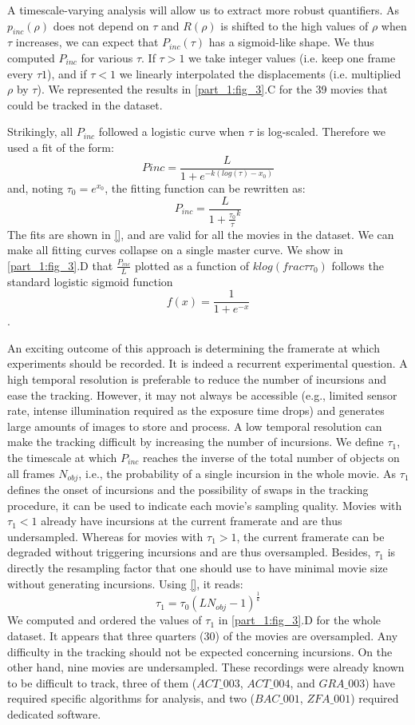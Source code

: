     A timescale-varying analysis will allow us to extract more robust quantifiers. As $p_{inc}(\rho)$ does not depend on $\tau$ and $R(\rho)$ is shifted to the high values of $\rho$ when $\tau$ increases, we can expect that $P_{inc}(\tau)$ has a sigmoid-like shape. We thus computed $P_{inc}$ for various $\tau$. If $\tau>1$ we take integer values (i.e. keep one frame every $\tau1$), and if $\tau<1$ we linearly interpolated the displacements (i.e. multiplied $\rho$ by $\tau$). We represented the results in \ref{part_1:fig_3}.C for the 39 movies that could be tracked in the dataset.

    Strikingly, all $P_{inc}$ followed a logistic curve when $\tau$ is log-scaled. Therefore we used a fit of the form:
    $$Pinc=\frac{L}{1 + e^{-k(log(\tau)-x_0)}}$$
    and, noting $\tau_0=e^{x_0}$, the fitting function can be rewritten as:
    $$P_{inc}=\frac{L}{1 + \frac{\tau_0}{\tau}^k}$$
    The fits are shown in \ref{}, and are valid for all the movies in the dataset. We can make all fitting curves collapse on a single master curve. We show in \ref{part_1:fig_3}.D that $\frac{P_{inc}}{L}$ plotted as a function of $klog(frac{\tau}{\tau_0})$ follows the standard logistic sigmoid function $$f(x) =\frac{1}{1+e^{-x}}$$.

    An exciting outcome of this approach is determining the framerate at which experiments should be recorded. It is indeed a recurrent experimental question. A high temporal resolution is preferable to reduce the number of incursions and ease the tracking. However, it may not always be accessible (e.g., limited sensor rate, intense illumination required as the exposure time drops) and generates large amounts of images to store and process. A low temporal resolution can make the tracking difficult by increasing the number of incursions.
    We define $\tau_1$, the timescale at which $P_{inc}$ reaches the inverse of the total number of objects on all frames $N_{obj}$, i.e., the probability of a single incursion in the whole movie. As $\tau_1$ defines the onset of incursions and the possibility of swaps in the tracking procedure, it can be used to indicate each movie's sampling quality. Movies with $\tau_1<1$ already have incursions at the current framerate and are thus undersampled. Whereas for movies with $\tau_1>1$, the current framerate can be degraded without triggering incursions and are thus oversampled. Besides, $\tau_1$ is directly the resampling factor that one should use to have minimal movie size without generating incursions. Using \ref{}, it reads:
    $$\tau_1=\tau_0(LN_{obj}-1)^{\frac{1}{k}}$$
    We computed and ordered the values of $\tau_1$ in \ref{part_1:fig_3}.D for the whole dataset. It appears that three quarters (30) of the movies are oversampled. Any difficulty in the tracking should not be expected concerning incursions. On the other hand, nine movies are undersampled. These recordings were already known to be difficult to track, three of them ($ACT\_003$, $ACT\_004$, and $GRA\_003$) have required specific algorithms for analysis, and two ($BAC\_001$, $ZFA\_001$) required dedicated software.

